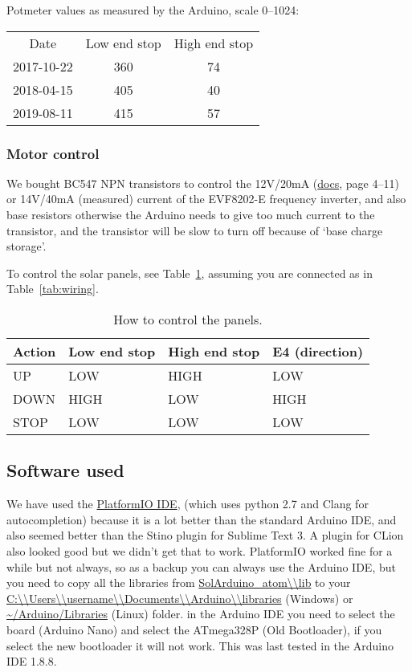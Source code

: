 Potmeter values as measured by the Arduino, scale 0--1024:

\begin{tabular}{ccc}
	Date & Low end stop & High end stop \\
	2017-10-22 & 360 & 74 \\
	2018-04-15 & 405 & 40 \\
	2019-08-11 & 415 & 57 \\
\end{tabular}


\subsubsection{Motor control}
We bought BC547 NPN transistors to control the 12V/20mA (\href{http://download.lenze.com/TD/8201-8204__Inverter__v02-08__EN.pdf }{docs}, page 4--11) or 14V/40mA (measured) current of the EVF8202-E frequency inverter, and also base resistors otherwise the Arduino needs to give too much current to the transistor, and the transistor will be slow to turn off because of `base charge storage'.

To control the solar panels, see Table~\ref{tab:control}, assuming you are connected as in Table~\ref{tab:wiring}.

\begin{table}
    \centering
    \begin{tabular}{llll}
        \toprule
        \textbf{Action} & \textbf{Low end stop} & \textbf{High end stop} & \textbf{E4 (direction)} \\
        \midrule
        UP & LOW & HIGH & LOW \\
        DOWN & HIGH & LOW & HIGH \\
        STOP & LOW & LOW & LOW \\
        \bottomrule
    \end{tabular}
    \caption{How to control the panels.}
    \label{tab:control}
\end{table}


\subsection{Software used}\label{subsec:softwareUsed}

We have used the \href{http://platformio.org/platformio-ide}{PlatformIO IDE}, (which uses python 2.7 and Clang for autocompletion) because it is a lot better than the standard Arduino IDE, and also seemed better than the Stino plugin for Sublime Text 3.
A plugin for CLion also looked good but we didn't get that to work.
PlatformIO worked fine for a while but not always, so as a backup you can always use the Arduino IDE, but you need to copy all the libraries from \url{SolArduino_atom\\lib} to your \url{C:\\Users\\username\\Documents\\Arduino\\libraries} (Windows) or \url{~/Arduino/Libraries} (Linux) folder.
in the Arduino IDE you need to select the board (Arduino Nano) and select the ATmega328P (Old Bootloader), if you select the new bootloader it will not work.
This was last tested in the Arduino IDE 1.8.8.